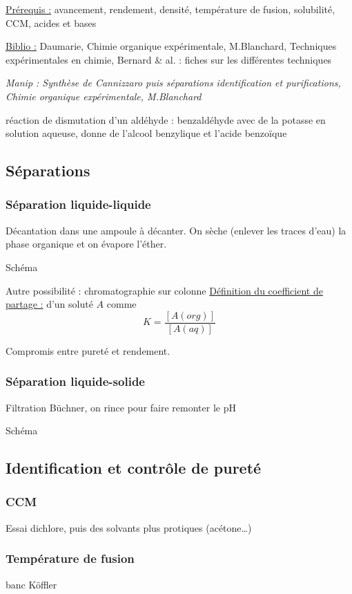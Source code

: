 \documentclass{article}%
\begin{document}
\underline{Prérequis :} avancement, rendement, densité, température de fusion, solubilité, CCM, acides et bases

\underline{Biblio :} Daumarie, Chimie organique expérimentale, M.Blanchard, Techniques expérimentales en chimie, Bernard \& al. : fiches sur les différentes techniques 

\textit{Manip : Synthèse de Cannizzaro puis séparations identification et purifications, Chimie organique expérimentale, M.Blanchard}

réaction de dismutation d'un aldéhyde : benzaldéhyde avec de la potasse en solution aqueuse, donne de l'alcool benzylique et l'acide benzoïque
\subsection{Séparations}
\subsubsection{Séparation liquide-liquide}
Décantation dans une ampoule à décanter. On sèche (enlever les traces d'eau) la phase organique et on évapore l'éther.

Schéma

Autre possibilité : chromatographie sur colonne
\underline{Définition du coefficient de partage :} d'un soluté $A$ comme \[K= \frac{[A(org)]}{[A(aq)]}\]

Compromis entre pureté et rendement.

\subsubsection{Séparation liquide-solide}
Filtration Büchner, on rince pour faire remonter le pH

Schéma

\subsection{Identification et contrôle de pureté}
\subsubsection{CCM}
Essai dichlore, puis des solvants plus protiques (acétone\dots)

\subsubsection{Température de fusion}
banc Köffler
\end{document}

